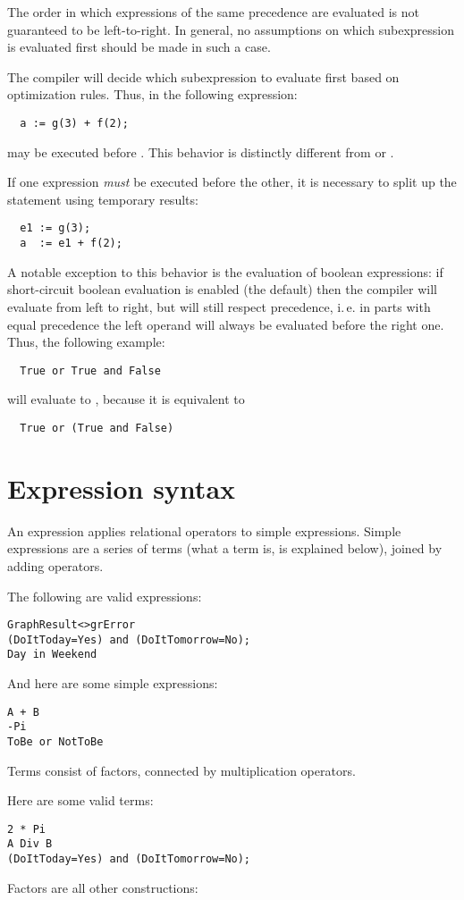 \begin{remark}
The order in which expressions of the same precedence are evaluated is not
guaranteed to be left-to-right. In general, no assumptions on which subexpression
is evaluated first should be made in such a case.

The compiler will decide which subexpression to evaluate first based on
optimization rules. Thus, in the following expression:
\begin{verbatim}
  a := g(3) + f(2);
\end{verbatim}
 may be executed before . This behavior is distinctly
different from \delphi{} or \tp{}.

If one expression {\em must} be executed before the other, it is necessary
to split up the statement using temporary results:
\begin{verbatim}
  e1 := g(3);
  a  := e1 + f(2);
\end{verbatim}

A notable exception to this behavior is the evaluation of boolean expressions: 
if short-circuit boolean evaluation is enabled (the default) then the
compiler will evaluate from left to right, but will still respect
precedence, i.\,e. in parts with equal precedence the left operand will always
be evaluated before the right one. Thus, the following example:
\begin{verbatim}
  True or True and False
\end{verbatim}
will evaluate to , because it is equivalent to
\begin{verbatim}
  True or (True and False)
\end{verbatim}
\end{remark}

\section{Expression syntax}
An expression applies relational operators to simple expressions. Simple
expressions are a series of terms (what a term is, is explained below), joined by
adding operators.

The following are valid expressions:
\begin{verbatim}
GraphResult<>grError
(DoItToday=Yes) and (DoItTomorrow=No);
Day in Weekend
\end{verbatim}
And here are some simple expressions:
\begin{verbatim}
A + B
-Pi
ToBe or NotToBe
\end{verbatim}
Terms consist of factors, connected by multiplication operators.

Here are some valid terms:
\begin{verbatim}
2 * Pi
A Div B
(DoItToday=Yes) and (DoItTomorrow=No);
\end{verbatim}
Factors are all other constructions:



